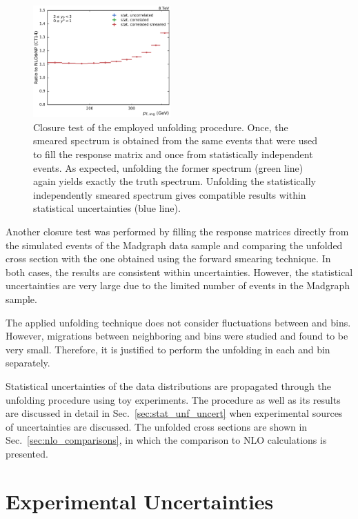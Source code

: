 \begin{figure}[htp]
    \includegraphics[width=0.47\textwidth]{figures/measurement/unf_nlo_check_yb2ys0.pdf}
    \caption[Closure check of unfolding technique]{Closure test of the employed unfolding
    procedure. Once, the smeared spectrum is obtained from the same events that
were used to fill the response matrix and once from statistically independent
events. As expected, unfolding the former spectrum (green line) again yields exactly the
truth spectrum. Unfolding the statistically independently smeared spectrum
gives compatible results within statistical uncertainties (blue line).}
    \label{fig:unf_closure_test}
\end{figure}

Another closure test was performed by filling the response matrices directly
from the simulated events of the Madgraph data sample and comparing the unfolded
cross section with the one obtained using the forward smearing technique. In
both cases, the results are consistent within uncertainties. However, the
statistical uncertainties are very large due to the limited number of events in
the Madgraph sample.

The applied unfolding technique does not consider fluctuations between
\ystar and \yboost bins. However, migrations between neighboring \ystar and
\yboost bins were studied and found to be very small. Therefore, it is justified
to perform the unfolding in each \ystar and \yboost bin separately.

Statistical uncertainties of the data distributions are propagated through the
unfolding procedure using toy experiments. The procedure as well as its results
are discussed in detail in Sec.~\ref{sec:stat_unf_uncert} when experimental
sources of uncertainties are discussed. The unfolded cross sections are shown in
Sec.~\ref{sec:nlo_comparisons}, in which the comparison to NLO calculations is
presented.

\section{Experimental Uncertainties}
\label{sec:experimental_uncertainties}

